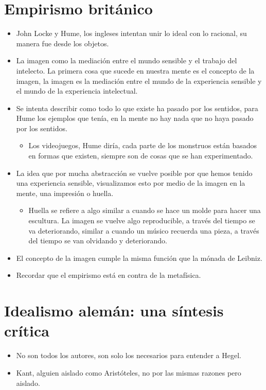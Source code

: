 \section{Empirismo británico}
\begin{itemize}
    \item John Locke y Hume, los ingleses intentan unir lo ideal con lo racional, su manera fue desde los objetos. 
    \item La imagen como la mediación entre el mundo sensible y el trabajo del intelecto. La primera cosa que sucede en nuestra mente es el concepto de la imagen, la imagen es la mediación entre el mundo de la experiencia sensible y el mundo de la experiencia intelectual. 
    \item Se intenta describir como todo lo que existe ha pasado por los sentidos, para Hume los ejemplos que tenía, en la mente no hay nada que no haya pasado por los sentidos. 
        \begin{itemize}
            \item Los videojuegos, Hume diría, cada parte de los monstruos están basados en formas que existen, siempre son de cosas que se han experimentado. 
        \end{itemize}
    \item La idea que por mucha abstracción se vuelve posible por que hemos tenido una experiencia sensible, visualizamos esto por medio de la imagen en la mente, una impresión o huella. 
        \begin{itemize}
            \item Huella se refiere a algo similar a cuando se hace un molde para hacer una escultura. La imagen se vuelve algo reproducible, a través del tiempo se va deteriorando, similar a cuando un músico recuerda una pieza, a través del tiempo se van olvidando y deteriorando. 
        \end{itemize}
    \item El concepto de la imagen cumple la misma función que la mónada de Leibniz.
    \item Recordar que el empirismo está en contra de la metafísica.
\end{itemize}


\section{Idealismo alemán: una síntesis crítica}
\begin{itemize}
    \item No son todos los autores, son solo los necesarios para entender a Hegel. 
    \item Kant, alguien aislado como Aristóteles, no por las mismas razones pero aislado. 
\end{itemize}

